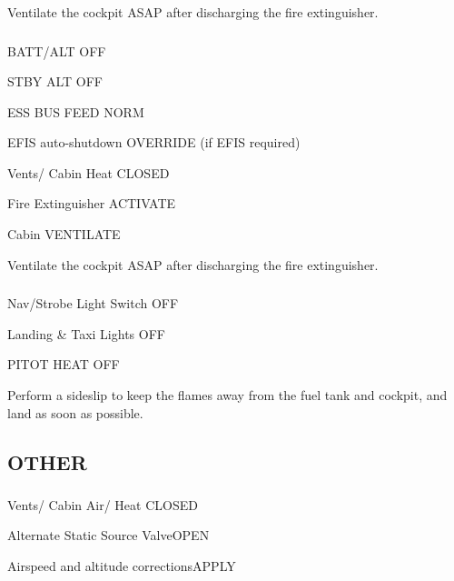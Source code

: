 \begin{multicols}{2}
\begin{Note}[WARNING]
  Ventilate the cockpit ASAP after discharging the fire extinguisher.
  \end{Note}
  
\subsubsection*{}

\begin{enumerate*}
\item BATT/ALT \dotfill OFF
\item STBY ALT \dotfill OFF
\item ESS BUS FEED \dotfill NORM
\item EFIS auto-shutdown \dotfill OVERRIDE (if EFIS required)
\item Vents/ Cabin Heat \dotfill CLOSED
\item Fire Extinguisher \dotfill ACTIVATE
\item Cabin \dotfill VENTILATE
\end{enumerate*}

\begin{Note}[WARNING]
  Ventilate the cockpit ASAP after discharging the fire extinguisher.
  \end{Note}
  
\subsubsection*{}

\begin{enumerate*}
\item Nav/Strobe Light Switch \dotfill OFF
\item Landing \& Taxi Lights \dotfill OFF
\item PITOT HEAT \dotfill OFF
\end{enumerate*}

\begin{Note}
  Perform a sideslip to keep the flames away from the fuel tank and cockpit, and land as soon as possible.
  \end{Note}

\subsection*{OTHER}
\subsubsection*{}
\begin{enumerate*}
  \item Vents/ Cabin Air/ Heat \dotfill CLOSED
  \item Alternate Static Source Valve\dotfill  OPEN
  \item Airspeed and altitude corrections\dotfill  APPLY
  \end{enumerate*}


\end{multicols}
